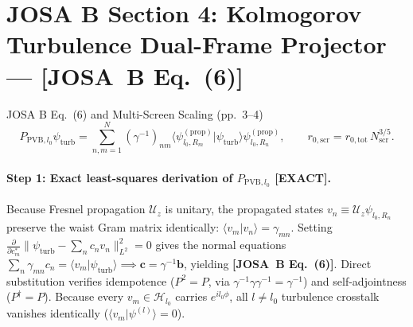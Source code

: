 \documentclass[10pt,letterpaper]{article}
\newcommand{\braket}[2]{\langle #1 | #2 \rangle}
\newcommand{\norm}[1]{\lVert #1 \rVert}
\newcommand{\josb}[1]{\textbf{[JOSA~B Eq.~(#1)]}}
\newcommand{\tagexact}{\textcolor{forest}{\textbf{[EXACT]}}}
\numberwithin{equation}{section}
\begin{document}
\section{JOSA B Section 4: Kolmogorov Turbulence Dual-Frame Projector --- \josb{6}}
\label{sec:v2_b4}

\begin{targeteq}{JOSA B Eq.~(6) and Multi-Screen Scaling (pp.~3--4)}
\[
  P_{\mathrm{PVB},l_0}\psi_{\mathrm{turb}} = \sum_{n,m=1}^N (\gamma^{-1})_{nm}\braket{\psi_{l_0,R_m}^{(\mathrm{prop})}}{\psi_{\mathrm{turb}}}\psi_{l_0,R_n}^{(\mathrm{prop})}, \qquad r_{0,\mathrm{scr}} = r_{0,\mathrm{tot}}\,N_{\mathrm{scr}}^{3/5}.
\]
\end{targeteq}

\paragraph*{Step 1: Exact least-squares derivation of $P_{\mathrm{PVB},l_0}$ \tagexact{}.}
Because Fresnel propagation $\mathcal{U}_z$ is unitary, the propagated states $v_n \equiv \mathcal{U}_z\psi_{l_0,R_n}$ preserve the waist Gram matrix identically: $\braket{v_m}{v_n} = \gamma_{mn}$. Setting $\frac{\partial}{\partial c_m^*}\norm{\psi_{\mathrm{turb}} - \sum_n c_n v_n}_{L^2}^2 = 0$ gives the normal equations $\sum_n \gamma_{mn} c_n = \braket{v_m}{\psi_{\mathrm{turb}}} \implies \mathbf{c} = \gamma^{-1}\mathbf{b}$, yielding \josb{6}. Direct substitution verifies idempotence ($P^2 = P$, via $\gamma^{-1}\gamma\gamma^{-1} = \gamma^{-1}$) and self-adjointness ($P^\dagger = P$). Because every $v_m \in \mathcal{H}_{l_0}$ carries $e^{il_0\phi}$, all $l \neq l_0$ turbulence crosstalk vanishes identically ($\braket{v_m}{\psi^{(l)}} = 0$).
\end{document}

